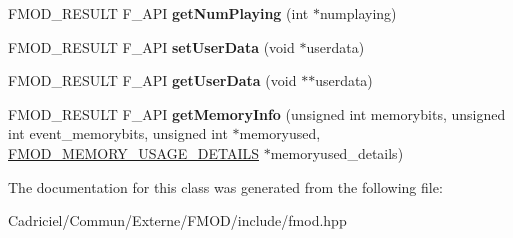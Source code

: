 \begin{DoxyCompactItemize}
\item 
F\+M\+O\+D\+\_\+\+R\+E\+S\+U\+LT F\+\_\+\+A\+PI {\bfseries get\+Num\+Playing} (int $\ast$numplaying)\hypertarget{class_f_m_o_d_1_1_sound_group_af88057e101e4dd2268d1a6f6656db75b}{}\label{class_f_m_o_d_1_1_sound_group_af88057e101e4dd2268d1a6f6656db75b}

\item 
F\+M\+O\+D\+\_\+\+R\+E\+S\+U\+LT F\+\_\+\+A\+PI {\bfseries set\+User\+Data} (void $\ast$userdata)\hypertarget{class_f_m_o_d_1_1_sound_group_a3315678b522baf2d74f732ab671f48c7}{}\label{class_f_m_o_d_1_1_sound_group_a3315678b522baf2d74f732ab671f48c7}

\item 
F\+M\+O\+D\+\_\+\+R\+E\+S\+U\+LT F\+\_\+\+A\+PI {\bfseries get\+User\+Data} (void $\ast$$\ast$userdata)\hypertarget{class_f_m_o_d_1_1_sound_group_ac428e826a819030cbab7ffa666d7d9cd}{}\label{class_f_m_o_d_1_1_sound_group_ac428e826a819030cbab7ffa666d7d9cd}

\item 
F\+M\+O\+D\+\_\+\+R\+E\+S\+U\+LT F\+\_\+\+A\+PI {\bfseries get\+Memory\+Info} (unsigned int memorybits, unsigned int event\+\_\+memorybits, unsigned int $\ast$memoryused, \hyperlink{struct_f_m_o_d___m_e_m_o_r_y___u_s_a_g_e___d_e_t_a_i_l_s}{F\+M\+O\+D\+\_\+\+M\+E\+M\+O\+R\+Y\+\_\+\+U\+S\+A\+G\+E\+\_\+\+D\+E\+T\+A\+I\+LS} $\ast$memoryused\+\_\+details)\hypertarget{class_f_m_o_d_1_1_sound_group_aab478a5f6edb8ef0eaf8d8fc70d1a448}{}\label{class_f_m_o_d_1_1_sound_group_aab478a5f6edb8ef0eaf8d8fc70d1a448}

\end{DoxyCompactItemize}


The documentation for this class was generated from the following file\+:\begin{DoxyCompactItemize}
\item 
Cadriciel/\+Commun/\+Externe/\+F\+M\+O\+D/include/fmod.\+hpp\end{DoxyCompactItemize}
